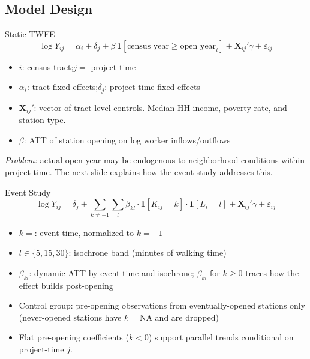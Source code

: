 \subsection{Model Design}
\begin{frame}[label=twfe]{Static TWFE}
\[
  \log Y_{ij} = \alpha_i + \delta_j
  + \beta\,\mathbf{1}[\text{census year} \ge \text{open year}_i]
  + \mathbf{X}_{ij}'\gamma + \varepsilon_{ij}
\]
\begin{itemize}
  \item $i$: census tract;\quad $j =$ project-time
  \item $\alpha_i$: tract fixed effects;\quad $\delta_j$: project-time fixed effects
  \item $\mathbf{X}_{ij}'$: vector of tract-level controls. Median HH income, poverty rate, and station type.
  \item $\beta$: ATT of station opening on log worker inflows/outflows
\end{itemize}
\medskip
\textit{Problem:} actual open year may be endogenous to neighborhood conditions within project time. The next slide explains how the event study addresses this.
\end{frame}
\begin{frame}[label=eventstudy]{Event Study}
\[
  \log Y_{ij} = \delta_j
  + \sum_{k \ne -1}\sum_l \beta_{kl}
    \cdot \mathbf{1}[K_{ij} = k]
    \cdot \mathbf{1}[L_i = l]
  + \mathbf{X}_{ij}'\gamma + \varepsilon_{ij}
\]
\begin{itemize}
  \item $k = $: event time, normalized to $k = -1$
  \item $l \in \{5, 15, 30\}$: isochrone band (minutes of walking time)
  \item $\beta_{kl}$: dynamic ATT by event time and isochrone; $\beta_{kl}$ for $k \ge 0$ traces how the effect builds post-opening
  \item Control group: pre-opening observations from eventually-opened stations only (never-opened stations have $k = \text{NA}$ and are dropped)
  \item Flat pre-opening coefficients ($k < 0$) support parallel trends conditional on project-time $j$.
\end{itemize}
\end{frame}
